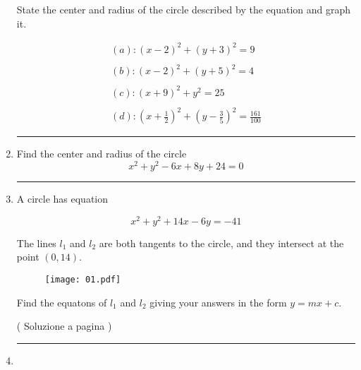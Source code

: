 \begin{enumerate}
State the center and radius of the circle described by the equation and graph it.

\[
\begin{split}
(a): (x-2)^2+(y+3)^2=9 \\
\\
(b): (x-2)^2+(y+5)^2=4 \\
\\
(c): (x+9)^2+y^2=25 \\
\\
(d): (x+\frac{1}{2})^2+(y-\frac{3}{5})^2=\frac{161}{100}
\end{split}
\]



\vspace{1cm}
\hrule
\vspace{1cm}


\item  \label{circ_04}

Find the center and radius of the circle 
\[
x^2+y^2-6x+8y+24=0 
\]




\vspace{1cm}
\hrule
\vspace{1cm}



\item  \label{geop_01}
A circle has equation 

\[
x^2+y^2+14x-6y=-41
\]

The lines $l_1$ and $l_2$ are both tangents to the circle, 
and they intersect at the point $(0,14)$.

\begin{figure}[h]
\centering
\texttt{[image: 01.pdf]}
\end{figure}

Find the equatons of $l_1$ and $l_2$ giving your answers in the form $y=mx+c$.

( Soluzione a pagina \pageref{geos_01} )


\vspace{1cm}
\hrule
\vspace{1cm}


\item  \label{circ_06}


\end{enumerate}
